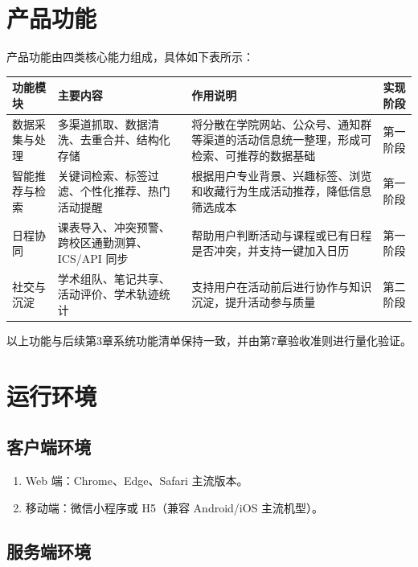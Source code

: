 \documentclass[UTF8,a4paper,12pt,fontset=none]{ctexrep}
\begin{document}
\section{产品功能}

产品功能由四类核心能力组成，具体如下表所示：

\begingroup
\small
\begin{longtable}{|>{\raggedright\arraybackslash}p{}|>{\raggedright\arraybackslash}p{}|>{\raggedright\arraybackslash}p{}|>{\raggedright\arraybackslash}p{}|}
\hline
\textbf{功能模块} & \textbf{主要内容} & \textbf{作用说明} & \textbf{实现阶段} \\
\hline
数据采集与处理 & 多渠道抓取、数据清洗、去重合并、结构化存储 & 将分散在学院网站、公众号、通知群等渠道的活动信息统一整理，形成可检索、可推荐的数据基础 & 第一阶段 \\
\hline
智能推荐与检索 & 关键词检索、标签过滤、个性化推荐、热门活动提醒 & 根据用户专业背景、兴趣标签、浏览和收藏行为生成活动推荐，降低信息筛选成本 & 第一阶段 \\
\hline
日程协同 & 课表导入、冲突预警、跨校区通勤测算、ICS/API 同步 & 帮助用户判断活动与课程或已有日程是否冲突，并支持一键加入日历 & 第一阶段 \\
\hline
社交与沉淀 & 学术组队、笔记共享、活动评价、学术轨迹统计 & 支持用户在活动前后进行协作与知识沉淀，提升活动参与质量 & 第二阶段 \\
\hline
\end{longtable}
\endgroup

以上功能与后续第3章系统功能清单保持一致，并由第7章验收准则进行量化验证。

\section{运行环境}

\subsection{客户端环境}

\begin{enumerate}[leftmargin=2.5em]
\item Web 端：Chrome、Edge、Safari 主流版本。
\item 移动端：微信小程序或 H5（兼容 Android/iOS 主流机型）。
\end{enumerate}

\subsection{服务端环境}
\end{document}
